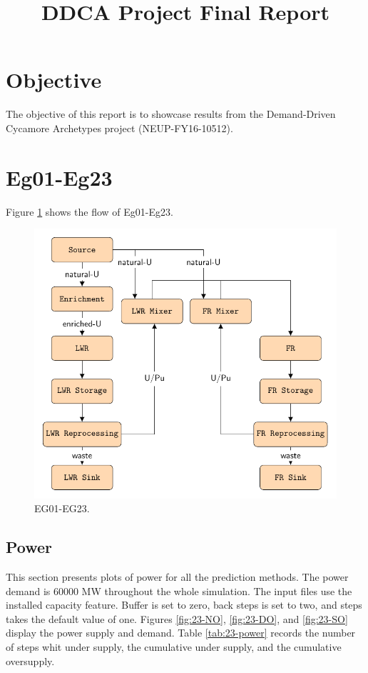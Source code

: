 \documentclass[11pt]{article}
\begin{document}
\title{DDCA Project Final Report}
\maketitle
\tableofcontents

\pagebreak

\section{Objective}
The objective of this report is to showcase results from the  
Demand-Driven Cycamore Archetypes project (NEUP-FY16-10512). 

\section{Eg01-Eg23}

Figure \ref{fig:23flow} shows the flow of Eg01-Eg23.

\begin{figure}[H]
	\centering
	\includegraphics[width=\textwidth]{23-figures/23flow.pdf} 
	\hfill
	\caption{EG01-EG23.}
	\label{fig:23flow}
\end{figure}

\subsection{Power}

This section presents plots of power for all the prediction methods. The power demand is 60000 MW throughout the whole simulation. The input files use the installed capacity feature. Buffer is set to zero, back steps is set to two, and steps takes the default value of one.
Figures \ref{fig:23-NO}, \ref{fig:23-DO}, and \ref{fig:23-SO} display the power supply and demand.
Table \ref{tab:23-power} records the number of steps whit under supply, the cumulative under supply, and the cumulative oversupply.
\end{document}
